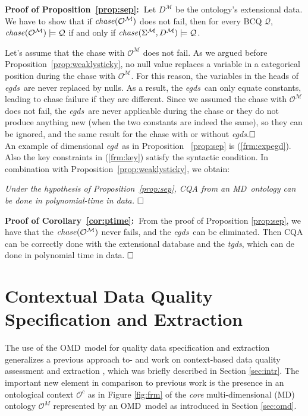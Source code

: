 \documentclass[format=acmsmall, review=false, screen=true]{acmart}
\newcommand{\dproof}[2]{{\noindent\bf Proof of #1:~}#2}
\newcommand{\boxtheorem}{\ensuremath{\hfill \Box}}
\newcommand{\mc}[1]{\mathcal{ #1}}
\newcommand{\omd}{OMD}
\newcommand{\md}{MD}
\newcommand{\egds}{{\em egds}}
\newcommand{\egd}{{\em egd}}
\newcommand{\tgds}{{\em tgds}}
\newcommand{\blue}[1]{{#1}}
\newcommand{\comlb}[1]{{\vspace{2mm}\noindent \bf \blue{COMM(LEO):}}~ #1 \hfill {\bf
    END.}\\}
\begin{document}
\dproof{Proposition~\ref{prop:sep}}{Let $D^\mc{M}$ be the ontology's extensional data. We have to show that if ${\it chase}(\mc{O}^\mc{M})$ does not fail, then for every BCQ $\mc{Q}$, ${\it chase}(\mc{O}^\mc{M}) \models \mc{Q}$ if and only if ${\it chase}(\Sigma^\mc{M},D^\mc{M}) \models \mc{Q}$.

Let's assume that the chase with $\mc{O}^\mc{M}$ does not fail.  As we argued before Proposition~\ref{prop:weaklysticky}, no null value replaces a variable in a categorical position during the chase with $\mc{O}^\mc{M}$. For this reason, the variables in the heads of \egds \ are never  replaced by nulls. As a result, the \egds \ can only equate constants, leading to chase failure if they are different. Since we assumed the chase with $\mc{O}^\mc{M}$
does not fail, the \egds \ are never applicable during the chase or they do not produce anything new (when the two constants are indeed the same), so they can be ignored, and the same result for the chase with or without \egds.\boxtheorem}\\


An example of dimensional \egd \ as in Proposition ~\ref{prop:sep} is (\ref{frm:expegd}). Also the key constraints in (\ref{frm:key}) satisfy the syntactic condition.
In combination with Proposition~\ref{prop:weaklysticky}, we obtain:

\begin{corollary} \em \label{cor:ptime}
Under the hypothesis of Proposition~\ref{prop:sep}, CQA from an \md \ ontology can be done in polynomial-time in data. \boxtheorem
\end{corollary}
\dproof{Corollary~\ref{cor:ptime}}{From the proof of Proposition \ref{prop:sep}, we have that the ${\it chase}(\mc{O}^\mc{M})$ never fails, and the \egds \ can be eliminated. Then CQA can be correctly done with
the extensional database and the \tgds, which can de done in polynomial time in data. \boxtheorem}



\section{Contextual Data Quality Specification and Extraction} \label{sec:fw}


The use of the \omd \ model for quality data specification and extraction generalizes a previous approach to- and work on context-based data quality assessment and extraction \cite{bertossi-brite,bertossi16}, which was briefly described in Section \ref{sec:intr}. The important new element in comparison to previous work is the presence in an ontological context $\mc{O}^c$ as in Figure \ref{fig:frm}  of the {\em core} multi-dimensional (MD) ontology $\mc{O}^M$ represented by an \omd \ model as introduced in Section \ref{sec:omd}.
\end{document}
